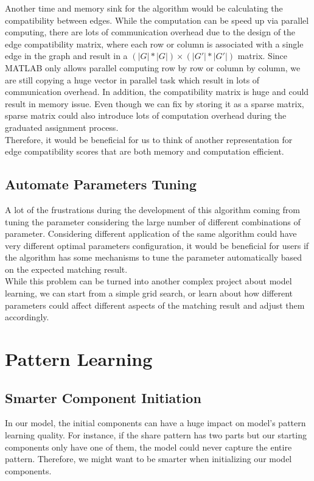 Another time and memory sink for the algorithm would be calculating the compatibility between edges. While the computation can be speed up via parallel computing, there are lots of communication overhead due to the design of the edge compatibility matrix, where each row or column is associated with a single edge in the graph and result in a $(|G|*|G|)\times(|G'|*|G'|)$ matrix. Since MATLAB only allows parallel computing row by row or column by column, we are still copying a huge vector in parallel task which result in lots of communication overhead. In addition, the compatibility matrix is huge and could result in memory issue. Even though we can fix by storing it as a sparse matrix, sparse matrix could also introduce lots of computation overhead during the graduated assignment process.\\

Therefore, it would be beneficial for us to think of another representation for edge compatibility scores that are both memory and computation efficient.

\subsection{Automate Parameters Tuning}

A lot of the frustrations during the development of this algorithm coming from tuning the parameter considering the large number of different combinations of parameter. Considering different application of the same algorithm could have very different optimal parameters configuration, it would be beneficial for users if the algorithm has some mechanisms to tune the parameter automatically based on the expected matching result.\\

While this problem can be turned into another complex project about model learning, we can start from a simple grid search, or learn about how different parameters could affect different aspects of the matching result and adjust them accordingly.


\section{Pattern Learning}

\subsection{Smarter Component Initiation}

In our model, the initial components can have a huge impact on model's pattern learning quality. For instance, if the share pattern has two parts but our starting components only have one of them, the model could never capture the entire pattern. Therefore, we might want to be smarter when initializing our model components.\\

